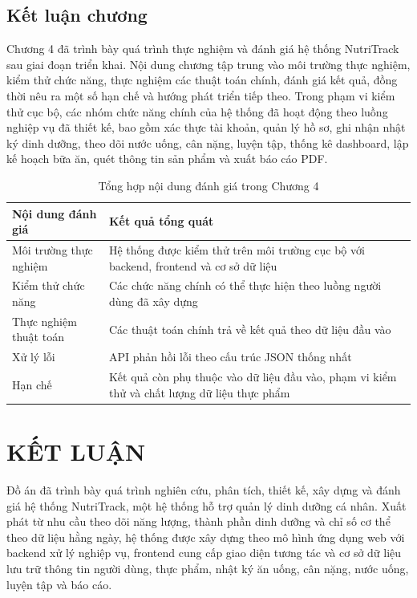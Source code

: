 \documentclass[12pt, a4paper]{report}
\begin{document}
\section{Kết luận chương}Chương 4 đã trình bày quá trình thực nghiệm và đánh giá hệ thống NutriTrack sau giai đoạn triển khai. Nội dung chương tập trung vào môi trường thực nghiệm, kiểm thử chức năng, thực nghiệm các thuật toán chính, đánh giá kết quả, đồng thời nêu ra một số hạn chế và hướng phát triển tiếp theo. Trong phạm vi kiểm thử cục bộ, các nhóm chức năng chính của hệ thống đã hoạt động theo luồng nghiệp vụ đã thiết kế, bao gồm xác thực tài khoản, quản lý hồ sơ, ghi nhận nhật ký dinh dưỡng, theo dõi nước uống, cân nặng, luyện tập, thống kê dashboard, lập kế hoạch bữa ăn, quét thông tin sản phẩm và xuất báo cáo PDF.

\begin{table}[htbp]
\centering
\caption{Tổng hợp nội dung đánh giá trong Chương 4}
\begin{tabular}{|p{5cm}|p{10cm}|}
\hline
\textbf{Nội dung đánh giá} & \textbf{Kết quả tổng quát} \\
\hline
Môi trường thực nghiệm & Hệ thống được kiểm thử trên môi trường cục bộ với backend, frontend và cơ sở dữ liệu \\
\hline
Kiểm thử chức năng & Các chức năng chính có thể thực hiện theo luồng người dùng đã xây dựng \\
\hline
Thực nghiệm thuật toán & Các thuật toán chính trả về kết quả theo dữ liệu đầu vào \\
\hline
Xử lý lỗi & API phản hồi lỗi theo cấu trúc JSON thống nhất \\
\hline
Hạn chế & Kết quả còn phụ thuộc vào dữ liệu đầu vào, phạm vi kiểm thử và chất lượng dữ liệu thực phẩm \\
\hline
\end{tabular}
\end{table}

\chapter*{KẾT LUẬN}
Đồ án đã trình bày quá trình nghiên cứu, phân tích, thiết kế, xây dựng và đánh giá hệ thống NutriTrack, một hệ thống hỗ trợ quản lý dinh dưỡng cá nhân. Xuất phát từ nhu cầu theo dõi năng lượng, thành phần dinh dưỡng và chỉ số cơ thể theo dữ liệu hằng ngày, hệ thống được xây dựng theo mô hình ứng dụng web với backend xử lý nghiệp vụ, frontend cung cấp giao diện tương tác và cơ sở dữ liệu lưu trữ thông tin người dùng, thực phẩm, nhật ký ăn uống, cân nặng, nước uống, luyện tập và báo cáo.
\end{document}
